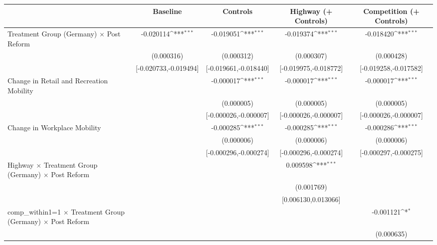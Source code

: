 {
\def\sym#1{\ifmmode^{#1}\else\(^{#1}\)\fi}
\begin{tabular}{l*{4}{c}}
\toprule
                    &\multicolumn{1}{c}{Baseline}&\multicolumn{1}{c}{Controls}&\multicolumn{1}{c}{Highway (+ Controls)}&\multicolumn{1}{c}{Competition (+ Controls)}\\
\midrule
Treatment Group (Germany) $\times$ Post Reform&   -0.020114\sym{***}&   -0.019051\sym{***}&   -0.019374\sym{***}&   -0.018420\sym{***}\\
                    &  (0.000316)         &  (0.000312)         &  (0.000307)         &  (0.000428)         \\
                    &[-0.020733,-0.019494]         &[-0.019661,-0.018440]         &[-0.019975,-0.018772]         &[-0.019258,-0.017582]         \\
Change in Retail and Recreation Mobility&                     &   -0.000017\sym{***}&   -0.000017\sym{***}&   -0.000017\sym{***}\\
                    &                     &  (0.000005)         &  (0.000005)         &  (0.000005)         \\
                    &                     &[-0.000026,-0.000007]         &[-0.000026,-0.000007]         &[-0.000026,-0.000007]         \\
Change in Workplace Mobility&                     &   -0.000285\sym{***}&   -0.000285\sym{***}&   -0.000286\sym{***}\\
                    &                     &  (0.000006)         &  (0.000006)         &  (0.000006)         \\
                    &                     &[-0.000296,-0.000274]         &[-0.000296,-0.000274]         &[-0.000297,-0.000275]         \\
Highway $\times$ Treatment Group (Germany) $\times$ Post Reform&                     &                     &    0.009598\sym{***}&                     \\
                    &                     &                     &  (0.001769)         &                     \\
                    &                     &                     &[0.006130,0.013066]         &                     \\
comp\_within1=1 $\times$ Treatment Group (Germany) $\times$ Post Reform&                     &                     &                     &   -0.001121\sym{*}  \\
                    &                     &                     &                     &  (0.000635)         \\

\end{tabular}}
